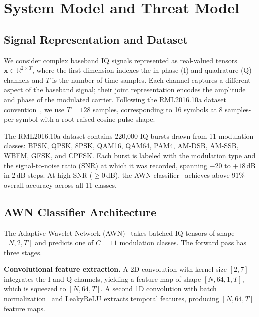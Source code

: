 \chapter{System Model and Threat Model}
\label{ch:architecture}

\section{Signal Representation and Dataset}

We consider complex baseband IQ signals represented as real-valued tensors
$\mathbf{x} \in \mathbb{R}^{2 \times T}$, where the first dimension indexes
the in-phase (I) and quadrature (Q) channels and $T$ is the number of time
samples. Each channel captures a different aspect of the baseband signal;
their joint representation encodes the amplitude and phase of the modulated
carrier. Following the RML2016.10a dataset convention~\cite{otoole2016rml},
we use $T = 128$ samples, corresponding to 16 symbols at 8 samples-per-symbol
with a root-raised-cosine pulse shape.

The RML2016.10a dataset contains 220{,}000 IQ bursts drawn from 11 modulation
classes: BPSK, QPSK, 8PSK, QAM16, QAM64, PAM4, AM-DSB, AM-SSB, WBFM, GFSK,
and CPFSK. Each burst is labeled with the modulation type and the
signal-to-noise ratio (SNR) at which it was recorded, spanning $-20$ to
$+18$\,dB in 2\,dB steps. At high SNR ($\geq 0$\,dB), the AWN
classifier~\cite{li2023awn} achieves above 91\% overall accuracy across all
11 classes.

\section{AWN Classifier Architecture}

The Adaptive Wavelet Network (AWN)~\cite{li2023awn} takes batched IQ tensors
of shape $[N, 2, T]$ and predicts one of $C = 11$ modulation classes. The
forward pass has three stages.

\textbf{Convolutional feature extraction.}
A 2D convolution with kernel size $[2, 7]$ integrates the I and Q channels,
yielding a feature map of shape $[N, 64, 1, T]$, which is squeezed to
$[N, 64, T]$. A second 1D convolution with batch
normalization~\cite{ioffe2015batch} and LeakyReLU extracts temporal features,
producing $[N, 64, T]$ feature maps.

